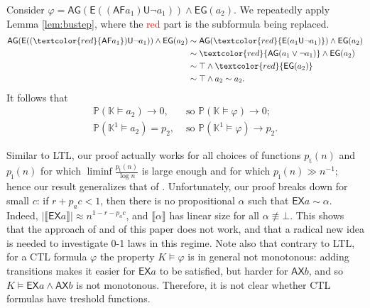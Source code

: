 \documentclass[runngingheads]{llncs}
\newcommand{\sem}[1]{\llbracket #1 \rrbracket}
\newcommand\recht\operatorname
\begin{document}
\begin{example}
Consider $\varphi = \mathsf{AG}(\mathsf{E}((\mathsf{AF} a_1)\mathsf{U}\neg a_1)) \wedge \mathsf{EG}(a_2)$. We repeatedly apply Lemma \ref{lem:bustep}, where the \textcolor{red}{red} part is the subformula being replaced.
\begin{align*}
 \mathsf{AG}(\mathsf{E}((\textcolor{red}{\mathsf{AF} a_1})\mathsf{U}\neg a_1)) \wedge \mathsf{EG}(a_2) &\sim \mathsf{AG}(\textcolor{red}{\mathsf{E}(a_1\mathsf{U}\neg a_1)}) \wedge \mathsf{EG}(a_2)  \\
&\sim \textcolor{red}{\mathsf{AG}(a_1 \vee \neg a_1)} \wedge \mathsf{EG}(a_2)  \\
&\sim \top \wedge \textcolor{red}{\mathsf{EG}(a_2)}  \\
&\sim \top \wedge a_2 \sim a_2.
\end{align*}
It follows that
\begin{align*}
\mathbb{P}(\mathbb{K} \models a_2) \rightarrow  0,& \textrm{ so } \mathbb{P}(\mathbb{K} \models \varphi) \rightarrow 0;\\
\mathbb{P}(\mathbb{K}^1 \models a_2) = p_2,& \textrm{ so } \mathbb{P}(\mathbb{K}^1 \models \varphi) \rightarrow p_2.
\end{align*}
\end{example}

\begin{remark}
Similar to LTL, our proof actually works for all choices of functions $p_{\recht{t}}(n)$ and $p_{\recht{i}}(n)$ for which $\liminf \tfrac{p_{\recht{t}}(n)}{\log n}$ is large enough and for which $p_{\recht{i}}(n) \gg n^{-1}$; hence our result generalizes that of \cite{dong20250}.
Unfortunately, our proof breaks down for small $c$: if $r+p_ac < 1$, then there is no propositional $\alpha$ such that $\mathsf{EX}a \sim \alpha$. Indeed, $|\sem{\mathsf{EX}a}| \approx n^{1-r-p_ac}$, and $\sem{\alpha}$ has linear size for all $\alpha \not \equiv \bot$. This shows that the approach of \cite{dong20250} and of this paper does not work, and that a radical new idea is needed to investigate 0-1 laws in this regime. Note also that contrary to LTL, for a CTL formula $\varphi$ the property $K \models \varphi$ is in general not monotonous: adding transitions makes it easier for $\mathsf{EX}a$ to be satisfied, but harder for $\mathsf{AX}b$, and so $K \models \mathsf{EX}a \wedge \mathsf{AX}b$ is not monotonous. Therefore, it is not clear whether CTL formulas have treshold functions.
\end{remark}
\end{document}
